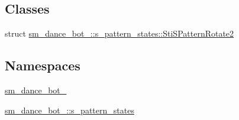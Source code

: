 \subsection*{Classes}
\begin{DoxyCompactItemize}
\item 
struct \hyperlink{structsm__dance__bot__2_1_1s__pattern__states_1_1StiSPatternRotate2}{sm\+\_\+dance\+\_\+bot\+\_\+::s\+\_\+pattern\+\_\+states\+::\+Sti\+S\+Pattern\+Rotate2}
\end{DoxyCompactItemize}
\subsection*{Namespaces}
\begin{DoxyCompactItemize}
\item 
 \hyperlink{namespacesm__dance__bot__2}{sm\+\_\+dance\+\_\+bot\+\_}
\item 
 \hyperlink{namespacesm__dance__bot__2_1_1s__pattern__states}{sm\+\_\+dance\+\_\+bot\+\_\+::s\+\_\+pattern\+\_\+states}
\end{DoxyCompactItemize}
